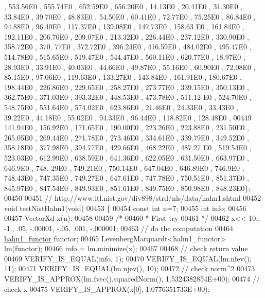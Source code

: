 \begin{DoxyCode}
       , 553.56E0 , 555.74E0 , 652.59E0 , 656.20E0 , 14.13E0 , 20.41E0 , 31.30E0 , 33.84E0 , 39.70E0 , 48.83E0 , 
      54.50E0 , 60.41E0 , 72.77E0 , 75.25E0 , 86.84E0 , 94.88E0 , 96.40E0 , 117.37E0 , 139.08E0 , 147.73E0 , 158.63
      E0 , 161.84E0 , 192.11E0 , 206.76E0 , 209.07E0 , 213.32E0 , 226.44E0 , 237.12E0 , 330.90E0 , 358.72E0 , 370.
      77E0 , 372.72E0 , 396.24E0 , 416.59E0 , 484.02E0 , 495.47E0 , 514.78E0 , 515.65E0 , 519.47E0 , 544.47E0 , 
      560.11E0 , 620.77E0 , 18.97E0 , 28.93E0 , 33.91E0 , 40.03E0 , 44.66E0 , 49.87E0 , 55.16E0 , 60.90E0 , 72.08E0 
      , 85.15E0 , 97.06E0 , 119.63E0 , 133.27E0 , 143.84E0 , 161.91E0 , 180.67E0 , 198.44E0 , 226.86E0 , 229.65E0 
      , 258.27E0 , 273.77E0 , 339.15E0 , 350.13E0 , 362.75E0 , 371.03E0 , 393.32E0 , 448.53E0 , 473.78E0 , 511.12
      E0 , 524.70E0 , 548.75E0 , 551.64E0 , 574.02E0 , 623.86E0 , 21.46E0 , 24.33E0 , 33.43E0 , 39.22E0 , 44.18E0 ,
       55.02E0 , 94.33E0 , 96.44E0 , 118.82E0 , 128.48E0 ,
00449 141.94E0 , 156.92E0 , 171.65E0 , 190.00E0 , 223.26E0 , 223.88E0 , 231.50E0 , 265.05E0 , 269.44E0 , 271.78E0
       , 273.46E0 , 334.61E0 , 339.79E0 , 349.52E0 , 358.18E0 , 377.98E0 , 394.77E0 , 429.66E0 , 468.22E0 , 487.27
      E0 , 519.54E0 , 523.03E0 , 612.99E0 , 638.59E0 , 641.36E0 , 622.05E0 , 631.50E0 , 663.97E0 , 646.9E0  , 748.
      29E0 , 749.21E0 , 750.14E0 , 647.04E0 , 646.89E0 , 746.9E0  , 748.43E0 , 747.35E0 , 749.27E0 , 647.61E0 , 
      747.78E0 , 750.51E0 , 851.37E0 , 845.97E0 , 847.54E0 , 849.93E0 , 851.61E0 , 849.75E0 , 850.98E0 , 848.23E0\};
00450 
00451 \textcolor{comment}{// http://www.itl.nist.gov/div898/strd/nls/data/hahn1.shtml}
00452 \textcolor{keywordtype}{void} testNistHahn1(\textcolor{keywordtype}{void})
00453 \{
00454   \textcolor{keyword}{const} \textcolor{keywordtype}{int}  n=7;
00455   \textcolor{keywordtype}{int} info;
00456 
00457   VectorXd x(n);
00458 
00459   \textcolor{comment}{/*}
00460 \textcolor{comment}{   * First try}
00461 \textcolor{comment}{   */}
00462   x<< 10., -1., .05, -.00001, -.05, .001, -.000001;
00463   \textcolor{comment}{// do the computation}
00464   \hyperlink{structhahn1__functor}{hahn1\_functor} functor;
00465   LevenbergMarquardt<hahn1\_functor> lm(functor);
00466   info = lm.minimize(x);
00467 
00468   \textcolor{comment}{// check return value}
00469   VERIFY\_IS\_EQUAL(info, 1);
00470   VERIFY\_IS\_EQUAL(lm.nfev(), 11);
00471   VERIFY\_IS\_EQUAL(lm.njev(), 10);
00472   \textcolor{comment}{// check norm^2}
00473   VERIFY\_IS\_APPROX(lm.fvec().squaredNorm(), 1.5324382854E+00);
00474   \textcolor{comment}{// check x}
00475   VERIFY\_IS\_APPROX(x[0], 1.0776351733E+00);

\end{DoxyCode}
